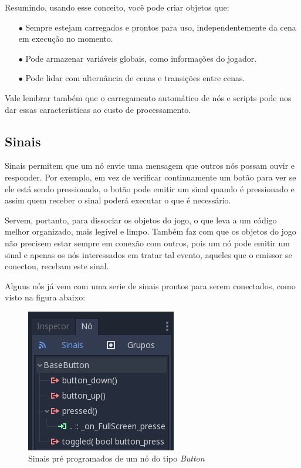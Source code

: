Resumindo, usando esse conceito, você pode criar objetos que:

\begin{itemize}
    \item[$\bullet$]
        Sempre estejam carregados e prontos para uso, independentemente da cena 
        em execução no momento.
    \item[$\bullet$]
        Pode armazenar variáveis globais, como informações do jogador.
    \item[$\bullet$]
        Pode lidar com alternância de cenas e transições entre cenas.
\end{itemize}

Vale lembrar também que o carregamento automático de nós e scripts pode nos dar 
essas características ao custo de processamento.

\subsection{Sinais}

Sinais permitem que um nó envie uma mensagem que outros nós possam ouvir e 
responder. Por exemplo, em vez de verificar continuamente um botão para ver se 
ele está sendo pressionado, o botão pode emitir um sinal quando é pressionado e
assim quem receber o sinal poderá executar o que é necessário.

Servem, portanto, para dissociar os objetos do jogo, o que leva a um código 
melhor organizado, mais legível e limpo. Também faz com que os objetos do jogo
não precisem estar sempre em conexão com outros, pois um nó pode emitir um sinal
e apenas os nós interessados em tratar tal evento, aqueles que o emissor se
conectou, recebam este sinal.

Alguns nós já vem com uma serie de sinais prontos para serem conectados, como
visto na figura abaixo:

\begin{figure}[H]
    \includegraphics[scale=0.4]{../figuras/sinais_pre_programados.png}
    \caption{Sinais pré programados de um nó do tipo \textit{Button}}
\end{figure}

